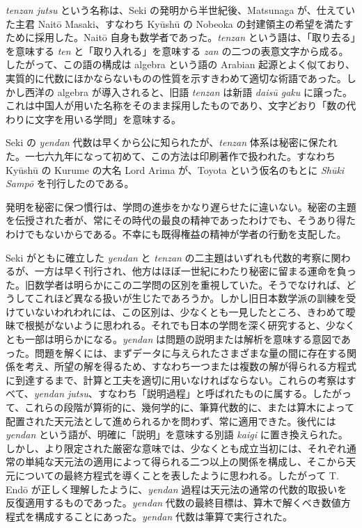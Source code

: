 \documentclass[11pt]{article}
\newcommand{\scanpage}[2]{\clearpage\setcounter{footnote}{0}\noindent{\footnotesize\color{gray}PDF #1 頁 · #2}\par\medskip}
\newcommand{\scanfooter}{}
\begin{document}
\emph{tenzan jutsu} という名称は、Seki の発明から半世紀後、Matsunaga が、仕えていた主君 Naitō Masaki、すなわち Kyūshū の Nobeoka の封建領主の希望を満たすために採用した。Naitō 自身も数学者であった。\emph{tenzan} という語は、「取り去る」を意味する \emph{ten} と「取り入れる」を意味する \emph{zan} の二つの表意文字から成る。したがって、この語の構成は algebra という語の Arabian 起源とよく似ており、実質的に代数にほかならないものの性質を示すきわめて適切な術語であった。しかし西洋の algebra が導入されると、旧語 \emph{tenzan} は新語 \emph{daisū gaku} に譲った。これは中国人が用いた名称をそのまま採用したものであり、文字どおり「数の代わりに文字を用いる学問」を意味する。

Seki の \emph{yendan} 代数は早くから公に知られたが、\emph{tenzan} 体系は秘密に保たれた。一七六九年になって初めて、この方法は印刷著作で扱われた。すなわち Kyūshū の Kurume の大名 Lord Arima が、Toyota という仮名のもとに \emph{Shūki Sampō} を刊行したのである。
\scanfooter

\scanpage{0175}{第22章、印刷頁161}
発明を秘密に保つ慣行は、学問の進歩をかなり遅らせたに違いない。秘密の主題を伝授された者が、常にその時代の最良の精神であったわけでも、そうあり得たわけでもないからである。不幸にも既得権益の精神が学者の行動を支配した。

Seki がともに確立した \emph{yendan} と \emph{tenzan} の二主題はいずれも代数的考察に関わるが、一方は早く刊行され、他方はほぼ一世紀にわたり秘密に留まる運命を負った。旧数学者は明らかにこの二学問の区別を重視していた。そうでなければ、どうしてこれほど異なる扱いが生じたであろうか。しかし旧日本数学派の訓練を受けていないわれわれには、この区別は、少なくとも一見したところ、きわめて曖昧で根拠がないように思われる。それでも日本の学問を深く研究すると、少なくとも一部は明らかになる。\emph{yendan} は問題の説明または解析を意味する意図であった。問題を解くには、まずデータに与えられたさまざまな量の間に存在する関係を考え、所望の解を得るため、すなわち一つまたは複数の解が得られる方程式に到達するまで、計算と工夫を適切に用いなければならない。これらの考察はすべて、\emph{yendan jutsu}、すなわち「説明過程」と呼ばれたものに属する。したがって、これらの段階が算術的に、幾何学的に、筆算代数的に、または算木によって配置された天元法として進められるかを問わず、常に適用できた。後代には \emph{yendan} という語が、明確に「説明」を意味する別語 \emph{kaigi} に置き換えられた。しかし、より限定された厳密な意味では、少なくとも成立当初には、それぞれ通常の単純な天元法の適用によって得られる二つ以上の関係を構成し、そこから天元についての最終方程式を導くことを表したように思われる。したがって T. Endō が正しく理解したように、\emph{yendan} 過程は天元法の通常の代数的取扱いを反復適用するものであった。\emph{yendan} 代数の最終目標は、算木で解くべき数値方程式を構成することにあった。\emph{yendan} 代数は筆算で実行された。
\end{document}
